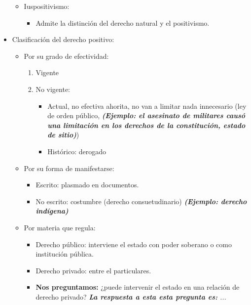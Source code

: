 \begin{itemize}
\begin{itemize}
            
            \item Iuspositivismo:
            \begin{itemize}
                \item Admite la distinción del derecho natural y el positivismo.
            \end{itemize}
        \end{itemize}
        
        \item Clasificación del derecho positivo:
        \begin{itemize}
            \item Por su grado de efectividad:
            \begin{enumerate}
                \item Vigente
                \item No vigente:
                \begin{itemize}
                    \item Actual, no efectiva ahorita, no van a limitar nada innecesario (ley de orden público, \textbf{\emph{(Ejemplo: el asesinato de militares causó una limitación en los derechos de la constitución, estado de sitio)}})
                    \item Histórico: derogado 
                \end{itemize}
            \end{enumerate}
            
            \item Por su forma de manifestarse:
            \begin{itemize}
                \item Escrito: plasmado en documentos.
                \item No escrito: costumbre (derecho consuetudinario) \textbf{\emph{(Ejemplo: derecho indígena)}}
            \end{itemize}

            
            \item Por materia que regula:
            \begin{itemize}
                \item Derecho público: interviene el estado con poder soberano o como institución pública. 
                \item Derecho privado: entre el particulares. 
                \item \textbf{Nos preguntamos:} ¿puede intervenir el estado en una relación de derecho privado? \emph{\textbf{La respuesta a esta esta pregunta es: }...}
            \end{itemize}
        \end{itemize} 







    \end{itemize}
    

